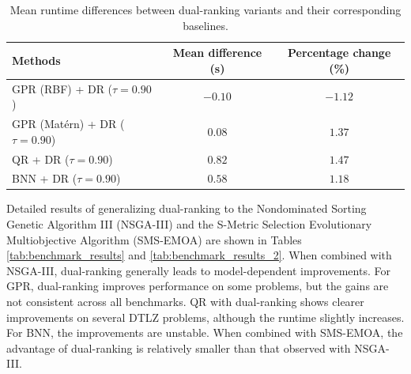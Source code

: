 \documentclass{article}
\begin{document}
\begin{table}[!htbp]
\caption{Mean runtime differences between dual-ranking variants and their corresponding baselines.}
\label{tab:runtime_diff}
\centering
\begin{tabular}{lcc}
\toprule
\textbf{Methods} & \textbf{Mean difference (s)} & \textbf{Percentage change (\%)} \\
\midrule
GPR (RBF) + DR ($\tau=0.90$) & $-0.10$ & $-1.12$ \\
GPR (Mat\'ern) + DR ($\tau=0.90$) & $0.08$ & $1.37$ \\
QR + DR ($\tau=0.90$) & $0.82$ & $1.47$ \\
BNN + DR ($\tau=0.90$) & $0.58$ & $1.18$ \\
\bottomrule
\end{tabular}
\end{table}

Detailed results of generalizing dual-ranking to the Nondominated Sorting Genetic Algorithm III (NSGA-III) \cite{nsga3} and the S-Metric Selection Evolutionary Multiobjective Algorithm (SMS-EMOA) \cite{sms_emoa} are shown in Tables \ref{tab:benchmark_results} and \ref{tab:benchmark_results_2}. When combined with NSGA-III, dual-ranking generally leads to model-dependent improvements. For GPR, dual-ranking improves performance on some problems, but the gains are not consistent across all benchmarks. QR with dual-ranking shows clearer improvements on several DTLZ problems, although the runtime slightly increases. For BNN, the improvements are unstable. When combined with SMS-EMOA, the advantage of dual-ranking is relatively smaller than that observed with NSGA-III.
\end{document}
